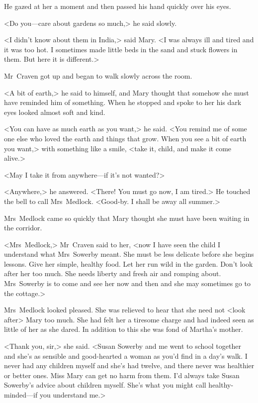 He gazed at her a moment and then passed his hand quickly over his eyes.

<Do you—care about gardens so much,> he said slowly.

<I didn't know about them in India,> said Mary. <I was always ill and tired and it was too hot. I sometimes made little beds in the sand and stuck flowers in them. But here it is different.>

Mr~Craven got up and began to walk slowly across the room.

<A bit of earth,> he said to himself, and Mary thought that somehow she must have reminded him of something. When he stopped and spoke to her his dark eyes looked almost soft and kind.

<You can have as much earth as you want,> he said. <You remind me of some one else who loved the earth and things that grow. When you see a bit of earth you want,> with something like a smile, <take it, child, and make it come alive.>

<May I take it from anywhere—if it's not wanted?>

<Anywhere,> he answered. <There! You must go now, I am tired.> He touched the bell to call Mrs~Medlock. <Good-by. I shall be away all summer.>

Mrs~Medlock came so quickly that Mary thought she must have been waiting in the corridor.

<Mrs~Medlock,> Mr~Craven said to her, <now I have seen the child I understand what Mrs~Sowerby meant. She must be less delicate before she begins lessons. Give her simple, healthy food. Let her run wild in the garden. Don't look after her too much. She needs liberty and fresh air and romping about. Mrs~Sowerby is to come and see her now and then and she may sometimes go to the cottage.>

Mrs~Medlock looked pleased. She was relieved to hear that she need not <look after> Mary too much. She had felt her a tiresome charge and had indeed seen as little of her as she dared. In addition to this she was fond of Martha's mother.

<Thank you, sir,> she said. <Susan Sowerby and me went to school together and she's as sensible and good-hearted a woman as you'd find in a day's walk. I never had any children myself and she's had twelve, and there never was healthier or better ones. Miss Mary can get no harm from them. I'd always take Susan Sowerby's advice about children myself. She's what you might call healthy-minded—if you understand me.>

